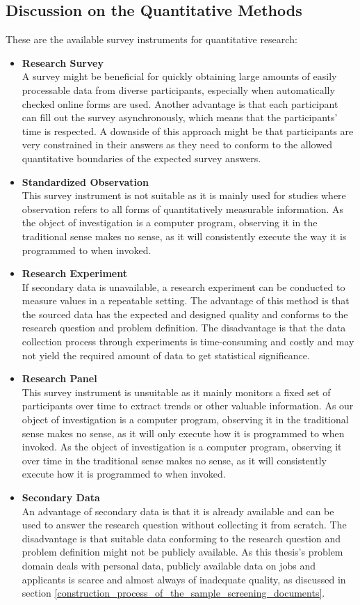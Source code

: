 \documentclass[draft,final]{thesisclass} %
\begin{document}
\subsection{Discussion on the Quantitative Methods}
These are the available survey instruments for quantitative research:
\begin{itemize}
    \item \textbf{Research Survey}\\
    A survey might be beneficial for quickly obtaining large amounts of easily processable data from diverse participants, especially when automatically checked online forms are used.
    Another advantage is that each participant can fill out the survey asynchronously, which means that the participants' time is respected.
    A downside of this approach might be that participants are very constrained in their answers as they need to conform to the allowed quantitative boundaries of the expected survey answers.
    \item \textbf{Standardized Observation}\\
    This survey instrument is not suitable as it is mainly used for studies where observation refers to all forms of quantitatively measurable information.
    As the object of investigation is a computer program, observing it in the traditional sense makes no sense, as it will consistently execute the way it is programmed to when invoked.
    \item \textbf{Research Experiment}\\
    If secondary data is unavailable, a research experiment can be conducted to measure values in a repeatable setting.
    The advantage of this method is that the sourced data has the expected and designed quality and conforms to the research question and problem definition.
    The disadvantage is that the data collection process through experiments is time-consuming and costly and may not yield the required amount of data to get statistical significance.
    \item \textbf{Research Panel}\\
    This survey instrument is unsuitable as it mainly monitors a fixed set of participants over time to extract trends or other valuable information. As our object of investigation is a computer program, observing it in the traditional sense makes no sense, as it will only execute how it is programmed to when invoked.
    As the object of investigation is a computer program, observing it over time in the traditional sense makes no sense, as it will consistently execute how it is programmed to when invoked.
    \item \textbf{Secondary Data}\\
    An advantage of secondary data is that it is already available and can be used to answer the research question without collecting it from scratch.
    The disadvantage is that suitable data conforming to the research question and problem definition might not be publicly available.
    As this thesis's problem domain deals with personal data, publicly available data on jobs and applicants is scarce and almost always of inadequate quality, as discussed in section \ref{construction_process_of_the_sample_screening_documents}.
\end{itemize}
\end{document}

